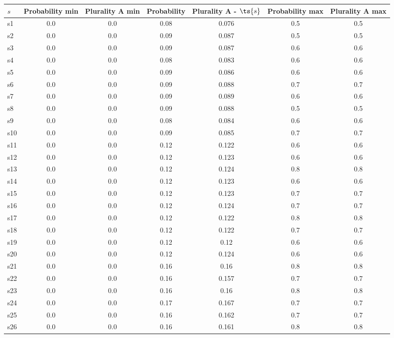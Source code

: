\documentclass{article}
\begin{document}
\noindent\begin{tabular}{|l|c|c|c|c|c|c|}
\hline
$s$& Probability min & Plurality A min & Probability & Plurality A - $\ts{s}$ & Probability max & Plurality A max\\
\hline
s1 &0.0 & 0.0 & 0.08 & 0.076 & 0.5 & 0.5\\
\hline
s2 &0.0 & 0.0 & 0.09 & 0.087 & 0.5 & 0.5\\
\hline
s3 &0.0 & 0.0 & 0.09 & 0.087 & 0.6 & 0.6\\
\hline
s4 &0.0 & 0.0 & 0.08 & 0.083 & 0.6 & 0.6\\
\hline
s5 &0.0 & 0.0 & 0.09 & 0.086 & 0.6 & 0.6\\
\hline
s6 &0.0 & 0.0 & 0.09 & 0.088 & 0.7 & 0.7\\
\hline
s7 &0.0 & 0.0 & 0.09 & 0.089 & 0.6 & 0.6\\
\hline
s8 &0.0 & 0.0 & 0.09 & 0.088 & 0.5 & 0.5\\
\hline
s9 &0.0 & 0.0 & 0.08 & 0.084 & 0.6 & 0.6\\
\hline
s10 &0.0 & 0.0 & 0.09 & 0.085 & 0.7 & 0.7\\
\hline
s11 &0.0 & 0.0 & 0.12 & 0.122 & 0.6 & 0.6\\
\hline
s12 &0.0 & 0.0 & 0.12 & 0.123 & 0.6 & 0.6\\
\hline
s13 &0.0 & 0.0 & 0.12 & 0.124 & 0.8 & 0.8\\
\hline
s14 &0.0 & 0.0 & 0.12 & 0.123 & 0.6 & 0.6\\
\hline
s15 &0.0 & 0.0 & 0.12 & 0.123 & 0.7 & 0.7\\
\hline
s16 &0.0 & 0.0 & 0.12 & 0.124 & 0.7 & 0.7\\
\hline
s17 &0.0 & 0.0 & 0.12 & 0.122 & 0.8 & 0.8\\
\hline
s18 &0.0 & 0.0 & 0.12 & 0.122 & 0.7 & 0.7\\
\hline
s19 &0.0 & 0.0 & 0.12 & 0.12 & 0.6 & 0.6\\
\hline
s20 &0.0 & 0.0 & 0.12 & 0.124 & 0.6 & 0.6\\
\hline
s21 &0.0 & 0.0 & 0.16 & 0.16 & 0.8 & 0.8\\
\hline
s22 &0.0 & 0.0 & 0.16 & 0.157 & 0.7 & 0.7\\
\hline
s23 &0.0 & 0.0 & 0.16 & 0.16 & 0.8 & 0.8\\
\hline
s24 &0.0 & 0.0 & 0.17 & 0.167 & 0.7 & 0.7\\
\hline
s25 &0.0 & 0.0 & 0.16 & 0.162 & 0.7 & 0.7\\
\hline
s26 &0.0 & 0.0 & 0.16 & 0.161 & 0.8 & 0.8\\
\hline

\end{tabular}
\end{document}
